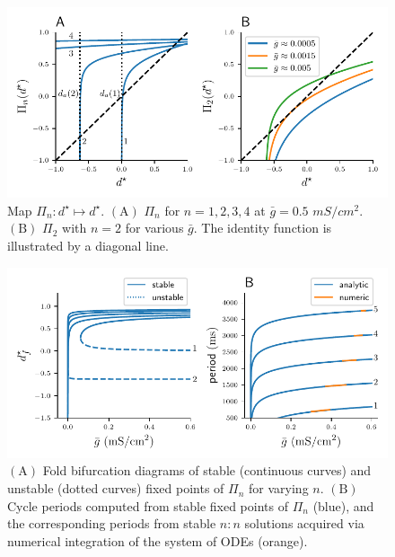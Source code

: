 \documentclass[utf8]{frontiersFPHY} %
\newcommand{\gbar}{\bar g}
\begin{document}
\begin{figure}[h!]
  \centering
  \includegraphics{Pn-map}
  \caption{Map $\Pi_{n}:d^{\star}\mapsto d^{\star}$. $\bm{\mathrm{(A)}}$ $\Pi_{n}$ for $n=1,2,3,4$
  at $\gbar=0.5$ $\si{mS/cm^{2}}$. $\bm{\mathrm{(B)}}$ $\Pi_{2}$ with $n=2$ for
  various $\gbar$. The identity function is illustrated by a diagonal line.~\label{fig:Pn-map}}
\end{figure}

\begin{figure}[h!]
  \centering
  \includegraphics{folds}
  \caption{$\bm{\mathrm{(A)}}$ Fold bifurcation diagrams of stable (continuous curves)
    and unstable (dotted curves) fixed points of $\Pi_{n}$ for varying $n$.
    $\bm{\mathrm{(B)}}$ Cycle periods computed from stable fixed points of $\Pi_{n}$ (blue), and the corresponding periods from stable $n:n$ solutions acquired via numerical integration of the system of ODEs
    (orange).~\label{fig:folds}}
\end{figure}
\end{document}
